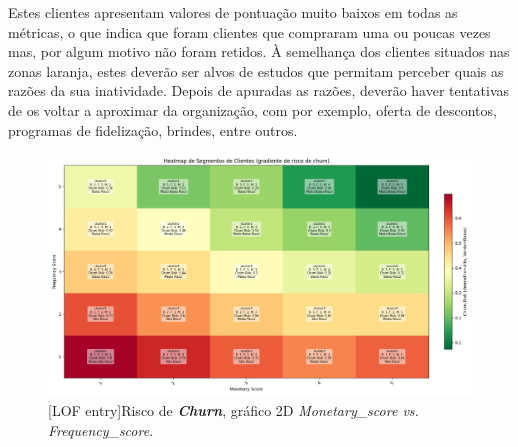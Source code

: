 \documentclass{easychair}
\begin{document}
\begin{enumerate}
Estes clientes apresentam valores de pontuação muito baixos em todas as métricas, o que indica que foram clientes que compraram uma ou poucas vezes mas, por algum motivo não foram retidos. À semelhança dos clientes situados nas zonas laranja, estes deverão ser alvos de estudos que permitam perceber quais as razões da sua inatividade. Depois de apuradas as razões, deverão haver tentativas de os voltar a aproximar da organização, com por exemplo, oferta de descontos, programas de fidelização, brindes, entre outros.
\end{enumerate}


\begin{figure}[H]
    \begin{centering}
    \includegraphics[width=1\linewidth]{imagens/figure29.jpg}\label{cap-5-fig29}
    [LOF entry]{Risco de \textbf{\textit{Churn}}, gráfico 2D \textit{Monetary_score vs. Frequency_score}.}
    \label{fig29}
    \end{centering}
\end{figure}
\end{document}
